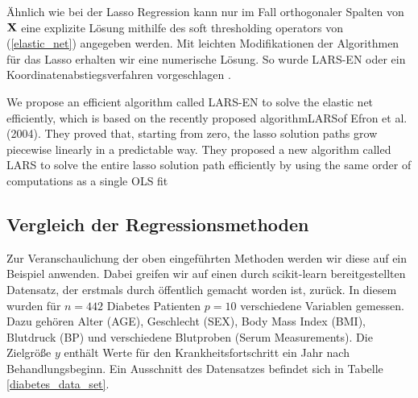 Ähnlich wie bei der Lasso Regression kann nur im Fall orthogonaler Spalten von $\mathbf{X}$ eine explizite Lösung mithilfe des soft thresholding operators von (\ref{elastic_net}) angegeben werden. Mit leichten Modifikationen der Algorithmen für das Lasso erhalten wir eine numerische Lösung. So wurde LARS-EN \cite{zou_elasticnet} oder ein Koordinatenabstiegsverfahren vorgeschlagen \cite{friedman}.

We propose an efficient algorithm called LARS-EN to solve the elastic net efficiently, which is
based on the recently proposed algorithmLARSof Efron et al. (2004). They proved that, starting
from zero, the lasso solution paths grow piecewise linearly in a predictable way. They proposed
a new algorithm called LARS to solve the entire lasso solution path efficiently by using the same
order of computations as a single OLS fit\\

\subsection{Vergleich der Regressionsmethoden}

Zur Veranschaulichung der oben eingeführten Methoden werden wir diese auf ein Beispiel anwenden. Dabei greifen wir auf einen durch scikit-learn \cite{scikit_learn} bereitgestellten Datensatz, der erstmals durch \cite{efron_lars} öffentlich gemacht worden ist, zurück. In diesem wurden für $n = 442$ Diabetes Patienten $p=10$ verschiedene Variablen gemessen. Dazu gehören Alter (AGE), Geschlecht (SEX), Body Mass Index (BMI), Blutdruck (BP) und verschiedene Blutproben (Serum Measurements). Die Zielgröße $y$ enthält Werte für den Krankheitsfortschritt ein Jahr nach Behandlungsbeginn. Ein Ausschnitt des Datensatzes befindet sich in Tabelle \ref{diabetes_data_set}.

